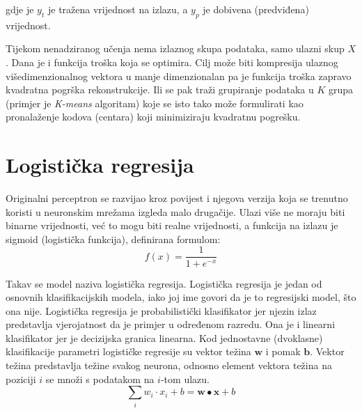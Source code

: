 \documentclass[times, utf8, diplomski, numeric]{fer}
\begin{document}
gdje je $y_t$ je tražena vrijednost na izlazu, a $y_p$ je dobivena (predviđena) vrijednost.

Tijekom nenadziranog učenja nema izlaznog skupa podataka, samo ulazni skup $X$. Dana je i funkcija troška koja se optimira.
Cilj može biti kompresija ulaznog višedimenzionalnog vektora u manje dimenzionalan pa je funkcija troška zapravo kvadratna pogrška rekonstrukcije. Ili se pak traži grupiranje podataka u $K$ grupa (primjer je \textit{K-means} algoritam\cite{Hartigan-1979}) koje se isto tako može formulirati kao pronalaženje kodova (centara) koji minimiziraju kvadratnu pogrešku.


\section{Logistička regresija}
\label{chap:logisticka_regresija}

Originalni perceptron se razvijao kroz povijest i njegova verzija koja se trenutno koristi u neuronskim mrežama izgleda malo drugačije. Ulazi više ne moraju biti binarne vrijednosti, već to mogu biti realne vrijednosti, a funkcija na izlazu je sigmoid (logistička funkcija), definirana formulom:
\begin{equation}
f(x) = \frac{1}{1+e^{-x}}
\end{equation}

Takav se model naziva logistička regresija. Logistička regresija je jedan od osnovnih klasifikacijskih modela, iako joj ime govori da je to regresijski model, što ona nije.
Logistička regresija je probabilistički klasifikator jer njezin izlaz predstavlja vjerojatnost da je primjer u određenom razredu.\cite{strojno_snajder}
Ona je i linearni klasifikator jer je decizijska granica linearna.
Kod jednostavne (dvoklasne) klasifikacije parametri logističke regresije su vektor težina $\boldsymbol{w}$ i pomak $\boldsymbol{b}$. Vektor težina predstavlja težine svakog neurona, odnosno element vektora težina na poziciji $i$ se množi s podatakom na $i$-tom ulazu.
\begin{equation}
  \sum_i w_i \cdot x_i + b = \boldsymbol{w} \bullet \boldsymbol{x} + b
\end{equation}
\end{document}
